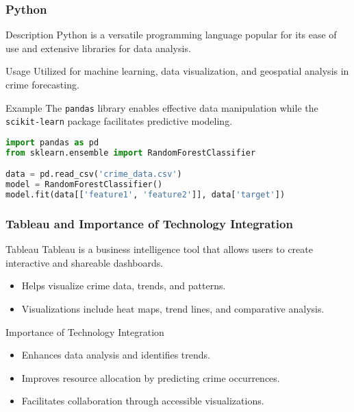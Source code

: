 \documentclass[aspectratio=169]{beamer}
\begin{document}
\begin{frame}[fragile]
    \frametitle{Python}
    \begin{block}{Description}
        Python is a versatile programming language popular for its ease of use and extensive libraries for data analysis.
    \end{block}
    \begin{block}{Usage}
        Utilized for machine learning, data visualization, and geospatial analysis in crime forecasting.
    \end{block}
    \begin{block}{Example}
        The \texttt{pandas} library enables effective data manipulation while the \texttt{scikit-learn} package facilitates predictive modeling.
    \end{block}
    \begin{lstlisting}[language=Python]
import pandas as pd
from sklearn.ensemble import RandomForestClassifier

data = pd.read_csv('crime_data.csv')
model = RandomForestClassifier()
model.fit(data[['feature1', 'feature2']], data['target'])
    \end{lstlisting}
\end{frame}

\begin{frame}[fragile]
    \frametitle{Tableau and Importance of Technology Integration}
    \begin{block}{Tableau}
        Tableau is a business intelligence tool that allows users to create interactive and shareable dashboards.
        
        \begin{itemize}
            \item Helps visualize crime data, trends, and patterns.
            \item Visualizations include heat maps, trend lines, and comparative analysis.
        \end{itemize}
    \end{block}
    
    \begin{block}{Importance of Technology Integration}
        \begin{itemize}
            \item Enhances data analysis and identifies trends.
            \item Improves resource allocation by predicting crime occurrences.
            \item Facilitates collaboration through accessible visualizations.
        \end{itemize}
    \end{block}
\end{frame}
\end{document}
